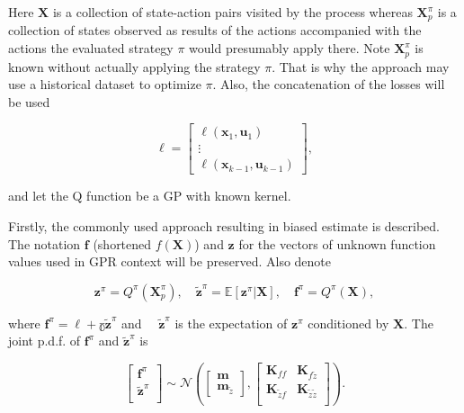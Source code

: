 \documentclass{ifacconf}
\begin{document}
Here $\mathbf{X}$ is a collection of state-action pairs visited by
the process whereas $\mathbf{X}_{p}^{\pi}$ is a collection of states
observed as results of the actions accompanied with the actions the
evaluated strategy $\pi$ would presumably apply there. Note $\mathbf{X}_{p}^{\pi}$
is known without actually applying the strategy $\pi$. That is why
the approach may use a historical dataset to optimize $\pi$. Also,
the concatenation of the losses will be used

\[
\mathbf{\boldsymbol{\ell}}=\left[\begin{array}{c}
\ell(\mathbf{x}_{1},\mathbf{u}_{1})\\
\vdots\\
\ell(\mathbf{x}_{k-1},\mathbf{u}_{k-1})
\end{array}\right],
\]

\noindent and let the Q function be a GP with known kernel. 

Firstly, the commonly used approach resulting in biased estimate is described. The notation $\mathbf{f}$ (shortened $f(\mathbf{X})$) and $\mathbf{z}$ for the vectors of unknown function values used in GPR context will be preserved. Also denote 

\[
\mathbf{z}^{\pi}=Q^{\pi}(\mathbf{X}_{p}^{\pi}),\quad\tilde{\mathbf{z}}^{\pi}=\mathbb{E}[\mathbf{z}^{\pi}|\mathbf{X}],\quad\mathbf{f}^{\pi}=Q^{\pi}(\mathbf{X}),
\]

where $\mathbf{f}^{\pi}=\mathbb{\boldsymbol{\ell}+\gamma}\tilde{\mathbf{z}}^{\pi}$ and $\quad\tilde{\mathbf{z}}^{\pi}$ is the expectation of $\mathbf{z}^{\pi}$ conditioned by $\mathbf{X}$.
The joint p.d.f. of $\mathbf{f}^{\pi}$ and $\tilde{\mathbf{z}}^{\pi}$ is

\[
\left[\begin{array}{c}\mathbf{f}^{\pi}\\\tilde{\mathbf{z}}^{\pi}\\\end{array}\right]\sim\mathcal{N}\left(\left[\begin{array}{c}
\mathbf{m}\\
\mathbf{m}_{\tilde{z}}
\end{array}\right],\left[\begin{array}{cc}
\mathbf{K}_{ff} & \mathbf{K}_{f\tilde{z}}\\
\mathbf{K}_{\tilde{z}f} & \mathbf{K}_{\tilde{z}\tilde{z}}\\
\end{array}\right]\right).
\]
\end{document}
